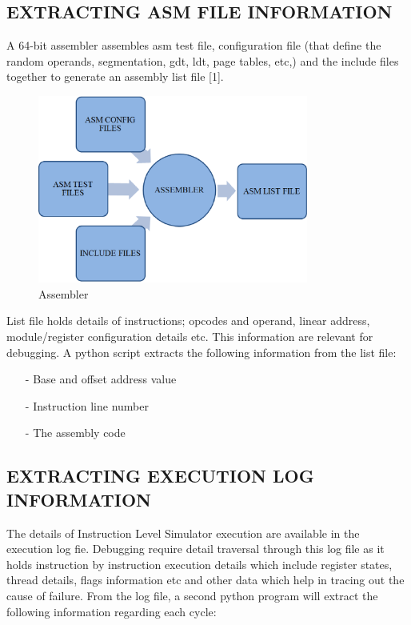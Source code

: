 \subsection {EXTRACTING ASM FILE INFORMATION}
A 64-bit assembler assembles asm test file, configuration file (that define the random operands, segmentation, gdt, ldt, page tables, etc,) and the include files together to generate an assembly list file [1].
\begin{figure}[H]
\centering
\includegraphics[width=3.5in]{./figures/asm.eps}
\caption{Assembler}
\end{figure}

List file holds details of instructions; opcodes and operand, linear address, module/register configuration details etc. This information are relevant for debugging. 
A python script extracts the following information from the list file:

\begin{itemize}
	\item[-] Base and offset address value
	\item[-] Instruction line number
	\item[-] The assembly code
\end{itemize}


\subsection {EXTRACTING EXECUTION LOG INFORMATION}
The details of Instruction Level Simulator execution are available in the execution log fie. Debugging require detail traversal through this log file as it holds instruction by instruction execution details which include register states, thread details, flags information etc and other data which help in tracing out the cause of failure. From the log file, a second python program will extract the following information regarding each cycle:

